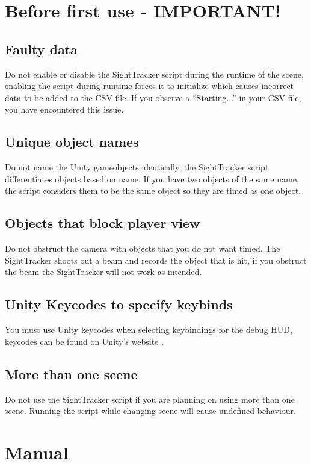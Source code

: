 \documentclass[letterpaper]{article}
\begin{document}
\section{Before first use - IMPORTANT!}
\subsection{Faulty data}
Do not enable or disable the SightTracker script during the runtime of the scene, enabling the script during runtime forces it to initialize which causes incorrect data to be added to the CSV file. If you observe a “Starting...” in your CSV file, you have encountered this issue.
\subsection{Unique object names}
Do not name the Unity gameobjects identically, the SightTracker script differentiates objects based on name. If you have two objects of the same name, the script considers them to be the same object so they are timed as one object.
\subsection{Objects that block player view}
Do not obstruct the camera with objects that you do not want timed. The SightTracker shoots out a beam and records the object that is hit, if you obstruct the beam the SightTracker will not work as intended.
\subsection{Unity Keycodes to specify keybinds}
You must use Unity keycodes when selecting keybindings for the debug HUD, keycodes can be found on Unity's website \cite{unitykeycode}.
\subsection{More than one scene}
Do not use the SightTracker script if you are planning on using more than one scene. Running the script while changing scene will cause undefined behaviour.
\newpage
\section{Manual}
\end{document}
